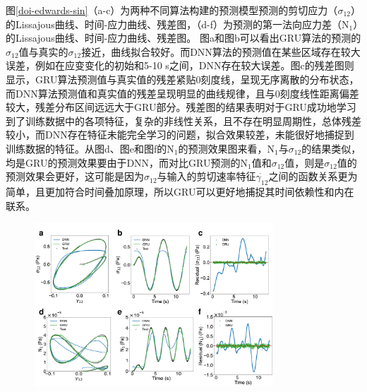 图\ref{doi-edwards-sin}（a-c）为两种不同算法构建的预测模型预测的剪切应力（$\sigma_{12}$）的Lissajous曲线、时间-应力曲线、残差图，（d-f）为预测的第一法向应力差（N$_{1}$）的Lissajous曲线、时间-应力曲线、残差图。
图a和图b可以看出GRU算法的预测的$\sigma_{12}$值与真实的$\sigma_{12}$接近，曲线拟合较好。而DNN算法的预测值在某些区域存在较大误差，例如在应变变化的初始和5-10 s之间，DNN存在较大误差。图c的残差图则显示，GRU算法预测值与真实值的残差紧贴0刻度线，呈现无序离散的分布状态，而DNN算法预测值和真实值的残差呈现明显的曲线规律，且与0刻度线性距离偏差较大，残差分布区间远远大于GRU部分。残差图的结果表明对于GRU成功地学习到了训练数据中的各项特征，复杂的非线性关系，且不存在明显周期性，总体残差较小，而DNN存在特征未能完全学习的问题，拟合效果较差，未能很好地捕捉到训练数据的特征。从图d、图e和图f的N$_1$的预测效果图来看，N$_1$与$\sigma_{12}$的结果类似，均是GRU的预测效果要由于DNN，而对比GRU预测的N$_1$值和$\sigma_{12}$值，则是$\sigma_{12}$值的预测效果会更好，这可能是因为$\sigma_{12}$与输入的剪切速率特征$\dot{\gamma_{12}}$之间的函数关系更为简单，且更加符合时间叠加原理，所以GRU可以更好地捕捉其时间依赖性和内在联系。
\begin{figure}[htbp]
  \centering
  \includegraphics[width=0.8\textwidth]{Fig/doi-edwards-sin.pdf}
  \FigureBicaption{\label{doi-edwards-sin}}{}
\end{figure}

